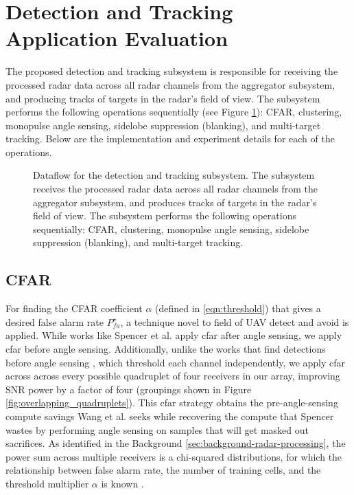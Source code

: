 \section{Detection and Tracking Application Evaluation}
\label{sec:tracking_app}
The proposed detection and tracking subsystem is responsible for receiving the processed 
radar data
across all radar channels from the aggregator subsystem, and producing tracks of
targets in the radar's field of view. The subsystem performs the following operations
sequentially (see Figure \ref{fig:dat-dataflow}): CFAR, clustering, monopulse 
angle sensing, sidelobe suppression (blanking), and multi-target tracking.
Below are the implementation and experiment details for each of the operations.

\begin{figure}[H]
    \centering
    \caption[Dataflow diagram for the detection and tracking subsystem.]{Dataflow for the detection 
    and tracking subsystem. The subsystem receives the processed radar data across all radar 
    channels from the aggregator subsystem, and produces tracks of targets in the radar's 
    field of view. The subsystem performs the following operations sequentially: CFAR, clustering, 
    monopulse angle sensing, sidelobe suppression (blanking), and multi-target tracking.}
    \label{fig:dat-dataflow}
\end{figure}

\subsection{CFAR}
For finding the CFAR coefficient $\alpha$ (defined in \ref{eqn:threshold}) 
that gives a desired false 
alarm rate $P_{fa}^{\star}$, a technique novel to field of UAV detect and avoid is applied. 
While works like Spencer et al. \cite{compact_spencer_2015} apply \gls{cfar} after angle sensing, we apply
\gls{cfar} before angle sensing. Additionally, unlike the works that find detections before angle 
sensing \cite{Wang2016, Moses2014}, which threshold each channel independently, we apply \gls{cfar} across
across every possible quadruplet of four receivers in our array, improving SNR power by a factor of four 
(groupings shown in Figure 
\ref{fig:overlapping_quadruplets}). This \gls{cfar} strategy obtains the pre-angle-sensing compute savings 
Wang et al.
seeks while recovering the compute that Spencer wastes by performing angle sensing on samples that will
get masked out sacrifices. 
As identified in the Background \ref{sec:background-radar-processing},
the power sum across multiple receivers is a chi-squared distributions, for which the relationship between 
false alarm rate, the number of training 
cells, and the threshold multiplier $\alpha$ is known \cite{Richards2005FundamentalsRadarSP}. 

